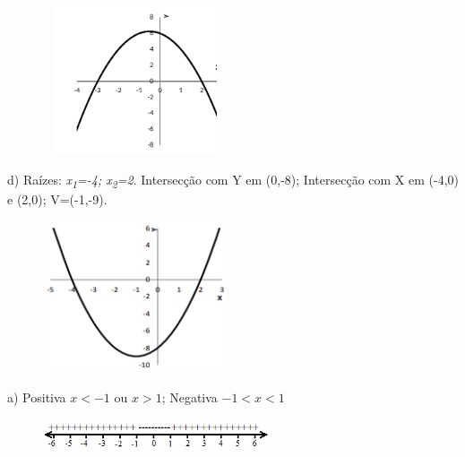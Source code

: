 \begin{enumerate}[label=\thechapter.\arabic*]
\begin{multicols}{2}
\begin{figure}[H]
	\begin{Center}
		\includegraphics[width=2.15in,height=1.71in]{capitulos/funcao_do_segundo_grau/media/image30.pdf}
	\end{Center}
\end{figure}
\end{multicols}

\begin{multicols}{2}
d) Raízes: \textit{x\textsubscript{1}=-4; x\textsubscript{2}=2}. Intersecção com Y em (0,-8); Intersecção com X em (-4,0) e (2,0);      V=(-1,-9).

\begin{figure}[H]
	\begin{Center}
		\includegraphics[width=2.15in,height=1.76in]{capitulos/funcao_do_segundo_grau/media/image31.png}
	\end{Center}
\end{figure}
\end{multicols}

\ansitem{}
\begin{multicols}{2}
a) Positiva $x<-1$ ou $x>1$; Negativa $-1 < x < 1$

\begin{figure}[H]
	\begin{Center}
		\includegraphics[width=2.65in,height=0.38in]{capitulos/funcao_do_segundo_grau/media/image32.png}
	\end{Center}
\end{figure}
\end{multicols}


\end{enumerate}
